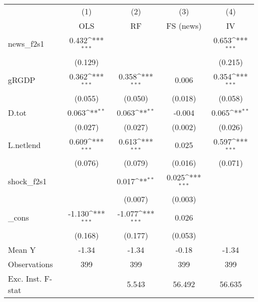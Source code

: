 {
\def\sym#1{\ifmmode^{#1}\else\(^{#1}\)\fi}
\begin{tabular}{l*{4}{c}}
\toprule
            &\multicolumn{1}{c}{(1)}&\multicolumn{1}{c}{(2)}&\multicolumn{1}{c}{(3)}&\multicolumn{1}{c}{(4)}\\
            &\multicolumn{1}{c}{OLS}&\multicolumn{1}{c}{RF}&\multicolumn{1}{c}{FS (news)}&\multicolumn{1}{c}{IV}\\
\midrule
news\_f2s1   &       0.432\sym{***}&                     &                     &       0.653\sym{***}\\
            &     (0.129)         &                     &                     &     (0.215)         \\
\addlinespace
gRGDP       &       0.362\sym{***}&       0.358\sym{***}&       0.006         &       0.354\sym{***}\\
            &     (0.055)         &     (0.050)         &     (0.018)         &     (0.058)         \\
\addlinespace
D.tot       &       0.063\sym{**} &       0.063\sym{**} &      -0.004         &       0.065\sym{**} \\
            &     (0.027)         &     (0.027)         &     (0.002)         &     (0.026)         \\
\addlinespace
L.netlend   &       0.609\sym{***}&       0.613\sym{***}&       0.025         &       0.597\sym{***}\\
            &     (0.076)         &     (0.079)         &     (0.016)         &     (0.071)         \\
\addlinespace
shock\_f2s1  &                     &       0.017\sym{**} &       0.025\sym{***}&                     \\
            &                     &     (0.007)         &     (0.003)         &                     \\
\addlinespace
\_cons      &      -1.130\sym{***}&      -1.077\sym{***}&       0.026         &                     \\
            &     (0.168)         &     (0.177)         &     (0.053)         &                     \\
\midrule
Mean Y      &       -1.34         &       -1.34         &       -0.18         &       -1.34         \\
Observations&         399         &         399         &         399         &         399         \\
Exc. Inst. F-stat&                     &       5.543         &      56.492         &      56.635         \\
\bottomrule
\end{tabular}
}
